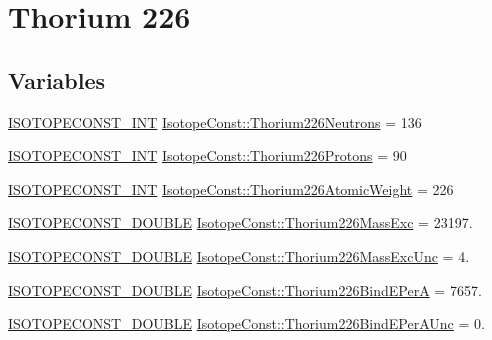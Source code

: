 \hypertarget{group___isotope_const-_thorium-_th226}{}\section{Thorium 226}
\label{group___isotope_const-_thorium-_th226}
\subsection*{Variables}
\begin{DoxyCompactItemize}
\item 
\mbox{\hyperlink{group___isotope_const-_macros_ga5f18360b3e99483a35c32d789e62621c}{I\+S\+O\+T\+O\+P\+E\+C\+O\+N\+S\+T\+\_\+\+I\+NT}} \mbox{\hyperlink{group___isotope_const-_thorium-_th226_ga9310bac16324a36954226e6164083b82}{Isotope\+Const\+::\+Thorium226\+Neutrons}} = 136
\item 
\mbox{\hyperlink{group___isotope_const-_macros_ga5f18360b3e99483a35c32d789e62621c}{I\+S\+O\+T\+O\+P\+E\+C\+O\+N\+S\+T\+\_\+\+I\+NT}} \mbox{\hyperlink{group___isotope_const-_thorium-_th226_ga827af59ad49431276ef4378ba49cb2a0}{Isotope\+Const\+::\+Thorium226\+Protons}} = 90
\item 
\mbox{\hyperlink{group___isotope_const-_macros_ga5f18360b3e99483a35c32d789e62621c}{I\+S\+O\+T\+O\+P\+E\+C\+O\+N\+S\+T\+\_\+\+I\+NT}} \mbox{\hyperlink{group___isotope_const-_thorium-_th226_gae02bbe9483b4757fd609a7f66d85a85b}{Isotope\+Const\+::\+Thorium226\+Atomic\+Weight}} = 226
\item 
\mbox{\hyperlink{group___isotope_const-_macros_ga8f45a7272ce02c0b4c65c44636ed719a}{I\+S\+O\+T\+O\+P\+E\+C\+O\+N\+S\+T\+\_\+\+D\+O\+U\+B\+LE}} \mbox{\hyperlink{group___isotope_const-_thorium-_th226_ga1500bf700707df60d84af928bdbf8795}{Isotope\+Const\+::\+Thorium226\+Mass\+Exc}} = 23197.
\item 
\mbox{\hyperlink{group___isotope_const-_macros_ga8f45a7272ce02c0b4c65c44636ed719a}{I\+S\+O\+T\+O\+P\+E\+C\+O\+N\+S\+T\+\_\+\+D\+O\+U\+B\+LE}} \mbox{\hyperlink{group___isotope_const-_thorium-_th226_ga8b1a084ff4a5c94424b780ee23abb93e}{Isotope\+Const\+::\+Thorium226\+Mass\+Exc\+Unc}} = 4.
\item 
\mbox{\hyperlink{group___isotope_const-_macros_ga8f45a7272ce02c0b4c65c44636ed719a}{I\+S\+O\+T\+O\+P\+E\+C\+O\+N\+S\+T\+\_\+\+D\+O\+U\+B\+LE}} \mbox{\hyperlink{group___isotope_const-_thorium-_th226_gae1e5e4005ce5219959da76e7ce1961d0}{Isotope\+Const\+::\+Thorium226\+Bind\+E\+PerA}} = 7657.
\item 
\mbox{\hyperlink{group___isotope_const-_macros_ga8f45a7272ce02c0b4c65c44636ed719a}{I\+S\+O\+T\+O\+P\+E\+C\+O\+N\+S\+T\+\_\+\+D\+O\+U\+B\+LE}} \mbox{\hyperlink{group___isotope_const-_thorium-_th226_ga4998f9d5b7720f7d4066ed37134dc3e2}{Isotope\+Const\+::\+Thorium226\+Bind\+E\+Per\+A\+Unc}} = 0.

\end{DoxyCompactItemize}
